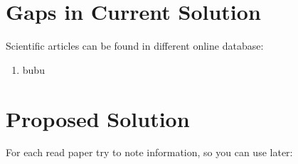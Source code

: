 \section{Gaps in Current Solution}

Scientific articles can be found in different online database:
\begin{enumerate}
    \item bubu
\end{enumerate}

\section{Proposed Solution}

For each read paper try to note information, so you can use later:

